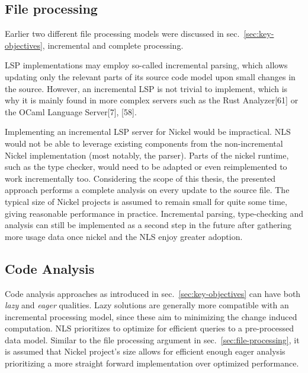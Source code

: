 \documentclass[
  a4paper,
  bibtex,
  english,
  nomenclature]{kthlatex/kththesis/kththesis}
\begin{document}
\hypertarget{sec:file-processing-1}{%
\subsection{File processing}\label{sec:file-processing-1}}

Earlier two different file processing models were discussed in
sec.~\ref{sec:key-objectives}, incremental and complete processing.

LSP implementations may employ so-called incremental parsing, which
allows updating only the relevant parts of its source code model upon
small changes in the source. However, an incremental LSP is not trivial
to implement, which is why it is mainly found in more complex servers
such as the Rust Analyzer{[}61{]} or the OCaml Language Server{[}7{]},
{[}58{]}.

Implementing an incremental LSP server for Nickel would be impractical.
NLS would not be able to leverage existing components from the
non-incremental Nickel implementation (most notably, the parser). Parts
of the nickel runtime, such as the type checker, would need to be
adapted or even reimplemented to work incrementally too. Considering the
scope of this thesis, the presented approach performs a complete
analysis on every update to the source file. The typical size of Nickel
projects is assumed to remain small for quite some time, giving
reasonable performance in practice. Incremental parsing, type-checking
and analysis can still be implemented as a second step in the future
after gathering more usage data once nickel and the NLS enjoy greater
adoption.

\hypertarget{sec:code-analysis}{%
\subsection{Code Analysis}\label{sec:code-analysis}}

Code analysis approaches as introduced in sec.~\ref{sec:key-objectives}
can have both \emph{lazy} and \emph{eager} qualities. Lazy solutions are
generally more compatible with an incremental processing model, since
these aim to minimizing the change induced computation. NLS prioritizes
to optimize for efficient queries to a pre-processed data model. Similar
to the file processing argument in sec.~\ref{sec:file-processing}, it is
assumed that Nickel project's size allows for efficient enough eager
analysis prioritizing a more straight forward implementation over
optimized performance.
\end{document}
